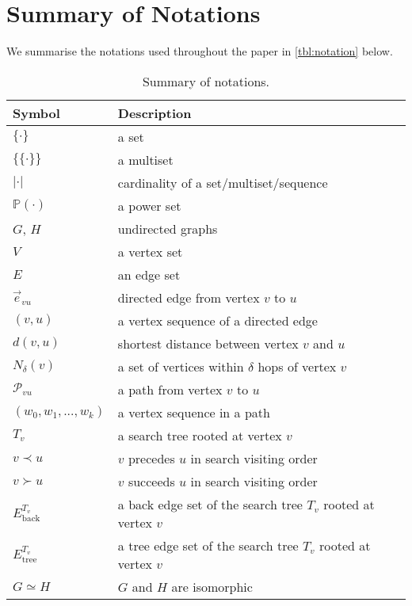\section{Summary of Notations}
We summarise the notations used throughout the paper in \autoref{tbl:notation} below.
\begin{table}[h!]
\caption{\label{tbl:notation}Summary of notations.}
\label{sample-table}
\vskip 0.15in
 \renewcommand*{\arraystretch}{1.2}
\begin{center}
\begin{small}
\begin{tabular}{ll}
\toprule
Symbol & Description\\
\midrule
$\{\cdot\}$    & a set \\
$\{\!\!\{\cdot\}\!\!\}$    & a multiset \\
$|\cdot|$    & cardinality of a set/multiset/sequence \\
$\mathbb{P}(\cdot)$    & a power set \\
$G$, $H$ & undirected graphs\\
$V$    & a vertex set \\
$E$    & an edge set\\
$\vec{e}_{vu}$     & directed edge from vertex $v$ to $u$\\
$(v,u)$     & a vertex sequence of a directed edge\\
$d(v,u)$     & shortest distance between vertex $v$ and $u$\\
$N_{\delta}(v)$     & a set of vertices within $\delta$ hops of vertex $v$ \\
$\mathcal{P}_{vu}$     & a path from vertex $v$ to $u$ \\
$(w_0,w_1,...,w_k)$     & a vertex sequence in a path\\
$T_v$     & a search tree rooted at vertex $v$\\
$v \prec u$ &  $v$ precedes $u$ in search visiting order \\
$v \succ u$ &  $v$ succeeds $u$ in search visiting order \\
$E_{\text{back}}^{T_v}$ & a back edge set of the search tree $T_v$ rooted at vertex $v$\\
$E_{\text{tree}}^{T_v}$ & a tree edge set of the search tree $T_v$ rooted at vertex $v$\\
$G\simeq H$ &  $G$ and $H$ are isomorphic \\

\end{tabular}
\end{small}
\end{center}
\end{table}
